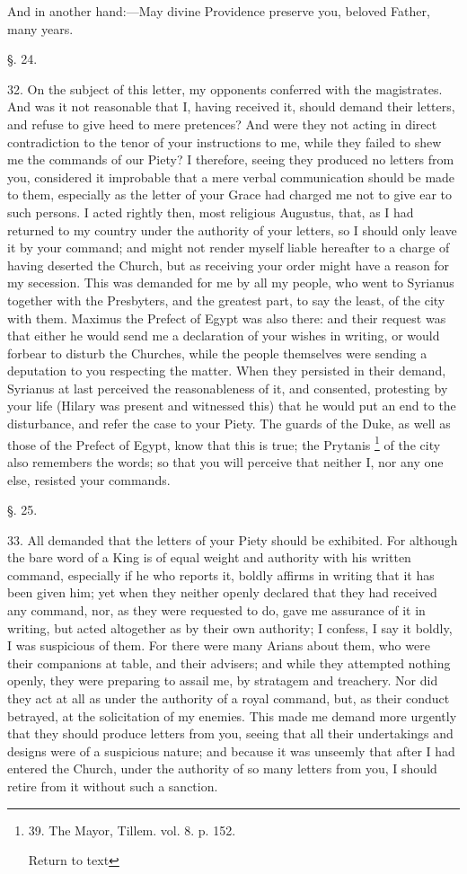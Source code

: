 And in another hand:—May divine Providence preserve you, beloved
Father, many years.

§. 24.

32. On the subject of this letter, my opponents conferred with the
magistrates. And was it not reasonable that I, having received it,
should demand their letters, and refuse to give heed to mere
pretences? And were they not acting in direct contradiction to the
tenor of your instructions to me, while they failed to shew me the
commands of our Piety? I therefore, seeing they produced no letters
from you, considered it improbable that a mere verbal communication
should be made to them, especially as the letter of your Grace had
charged me not to give ear to such persons. I acted rightly then, most
religious Augustus, that, as I had returned to my country under the
authority of your letters, so I should only leave it by your command;
and might not render myself liable hereafter to a charge of having
deserted the Church, but as receiving your order might have a reason
for my secession. This was demanded for me by all my people, who
went to Syrianus together with the Presbyters, and the greatest part,
to say the least, of the city with them. Maximus the Prefect of Egypt
was also there: and their request was that either he would send me a
declaration of your wishes in writing, or would forbear to disturb the
Churches, while the people themselves were sending a deputation to you
respecting the matter. When they persisted in their demand, Syrianus
at last perceived the reasonableness of it, and consented, protesting
by your life (Hilary was present and witnessed this) that he would put
an end to the disturbance, and refer the case to your Piety. The
guards of the Duke, as well as those of the Prefect of Egypt, know
that this is true; the Prytanis \footnote{39. The Mayor, Tillem. vol. 8. p. 152.

Return to text} of the city also remembers the words; so that you will
perceive that neither I, nor any one else, resisted your commands.

§. 25.

33. All demanded that the letters of your Piety should be exhibited. For
although the bare word of a King is of equal weight and authority with
his written command, especially if he who reports it, boldly affirms
in writing that it has been given him; yet when they neither openly
declared that they had received any command, nor, as they were
requested to do, gave me assurance of it in writing, but acted
altogether as by their own authority; I confess, I say it boldly, I
was suspicious of them. For there were many Arians about them, who
were their companions at table, and their advisers; and while they
attempted nothing openly, they were preparing to assail me, by
stratagem and treachery. Nor did they act at all as under the
authority of a royal command, but, as their conduct betrayed, at the
solicitation of my enemies. This made me demand more urgently that
they should produce letters from you, seeing that all their
undertakings and designs were of a suspicious nature; and because it
was unseemly that after I had entered the Church, under the authority
of so many letters from you, I should retire from it without such a
sanction.

